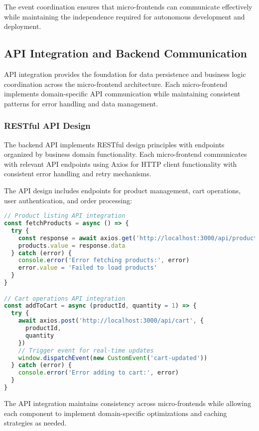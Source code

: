 \documentclass[12pt,a4paper]{report}
\begin{document}
The event coordination ensures that micro-frontends can communicate effectively while maintaining the independence required for autonomous development and deployment.

\subsection{API Integration and Backend Communication}

API integration provides the foundation for data persistence and business logic coordination across the micro-frontend architecture. Each micro-frontend implements domain-specific API communication while maintaining consistent patterns for error handling and data management.

\subsubsection{RESTful API Design}

The backend API implements RESTful design principles with endpoints organized by business domain functionality. Each micro-frontend communicates with relevant API endpoints using Axios for HTTP client functionality with consistent error handling and retry mechanisms.

The API design includes endpoints for product management, cart operations, user authentication, and order processing:

\begin{lstlisting}[language=JavaScript, caption=API Endpoint Integration]
// Product listing API integration
const fetchProducts = async () => {
  try {
    const response = await axios.get('http://localhost:3000/api/products')
    products.value = response.data
  } catch (error) {
    console.error('Error fetching products:', error)
    error.value = 'Failed to load products'
  }
}

// Cart operations API integration
const addToCart = async (productId, quantity = 1) => {
  try {
    await axios.post('http://localhost:3000/api/cart', {
      productId,
      quantity
    })
    // Trigger event for real-time updates
    window.dispatchEvent(new CustomEvent('cart-updated'))
  } catch (error) {
    console.error('Error adding to cart:', error)
  }
}
\end{lstlisting}

The API integration maintains consistency across micro-frontends while allowing each component to implement domain-specific optimizations and caching strategies as needed.
\end{document}
